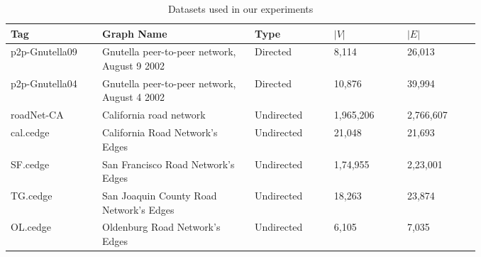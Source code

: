     \begin{table}[h]
    \caption{Datasets used in our experiments}
    \label{tab:dataset}
        \centering
        \begin{tabular}{| p{0.15\linewidth} | p{0.25\linewidth} | p{0.13\linewidth} | p{0.12\linewidth} | p{0.12\linewidth} |}
            \hline
            Tag & Graph Name & Type & $|V|$ & $|E|$ \\ \hline \hline
            p2p-Gnutella09 & Gnutella peer-to-peer network, August 9 2002 & Directed & 8,114 & 26,013 \\ \hline
            p2p-Gnutella04 &Gnutella peer-to-peer network, August 4 2002 & Directed & 10,876 & 39,994 \\ \hline
            roadNet-CA & California road network & Undirected & 1,965,206 & 2,766,607 \\ \hline
            cal.cedge & California Road Network's Edges & Undirected & 21,048 & 21,693 \\ \hline
            SF.cedge & San Francisco Road Network's Edges & Undirected & 1,74,955 & 2,23,001 \\ \hline
            TG.cedge & San Joaquin County Road Network's Edges & Undirected & 18,263 & 23,874 \\ \hline
            OL.cedge & Oldenburg Road Network's Edges & Undirected & 6,105 & 7,035 \\ \hline
        \end{tabular}
    \end{table}
